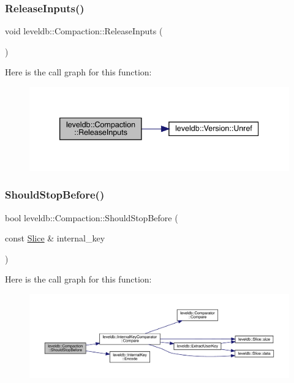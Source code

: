 \subsubsection{\texorpdfstring{ReleaseInputs()}{ReleaseInputs()}}
{\footnotesize\ttfamily void leveldb\+::\+Compaction\+::\+Release\+Inputs (\begin{DoxyParamCaption}{ }\end{DoxyParamCaption})}

Here is the call graph for this function\+:
\nopagebreak
\begin{figure}[H]
\begin{center}
\leavevmode
\includegraphics[width=339pt]{classleveldb_1_1_compaction_a87ec90747d22dce0d103149db1ecf709_cgraph}
\end{center}
\end{figure}
\mbox{\label{classleveldb_1_1_compaction_a07624423bb512fedb358a008a38fa0b9}} 
\subsubsection{\texorpdfstring{ShouldStopBefore()}{ShouldStopBefore()}}
{\footnotesize\ttfamily bool leveldb\+::\+Compaction\+::\+Should\+Stop\+Before (\begin{DoxyParamCaption}\item[{const \mbox{\hyperlink{classleveldb_1_1_slice}{Slice}} \&}]{internal\+\_\+key }\end{DoxyParamCaption})}

Here is the call graph for this function\+:
\nopagebreak
\begin{figure}[H]
\begin{center}
\leavevmode
\includegraphics[width=350pt]{classleveldb_1_1_compaction_a07624423bb512fedb358a008a38fa0b9_cgraph}
\end{center}
\end{figure}


